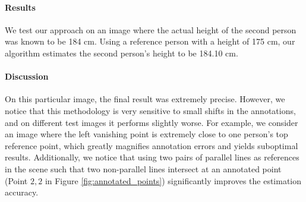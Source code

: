 \paragraph{Results} We test our approach on an image where the actual height of the second person was known to be 184 cm. Using a reference person with a height of 175 cm, our algorithm estimates the second person's height to be 184.10 cm.

\paragraph{Discussion} On this particular image, the final result was extremely precise. However, we notice that this methodology is very sensitive to small shifts in the annotations, and on different test images it performs slightly worse. For example, we consider an image where the left vanishing point is extremely close to one person's top reference point, which greatly magnifies annotation errors and yields suboptimal results. Additionally, we notice that using two pairs of parallel lines as references in the scene such that two non-parallel lines intersect at an annotated point (Point $2,2$ in Figure \ref{fig:annotated_points}) significantly improves the estimation accuracy.  